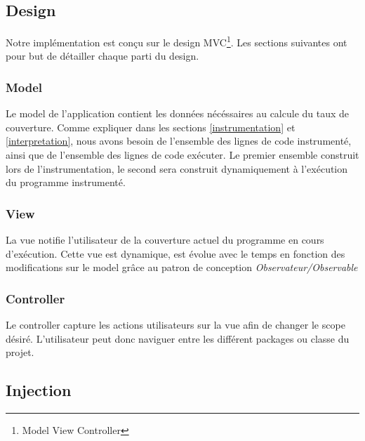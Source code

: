 \subsection{Design}

Notre implémentation est conçu sur le design MVC\footnote{Model View Controller}. Les sections suivantes ont pour but de détailler chaque parti du design.

\subsubsection{Model}

Le model de l'application contient les données nécéssaires au calcule du taux de couverture. Comme expliquer dans les sections \ref{instrumentation} et \ref{interpretation}, nous avons besoin de l'ensemble des lignes de code instrumenté, ainsi que de l'ensemble des lignes de code exécuter. Le premier ensemble construit lors de l'instrumentation, le second sera construit dynamiquement à l'exécution du programme instrumenté.

\subsubsection{View}

La vue notifie l'utilisateur de la couverture actuel du programme en cours d'exécution. Cette vue est dynamique, est évolue avec le temps en fonction des modifications sur le model grâce au patron de conception \textit{Observateur/Observable}

\subsubsection{Controller}

Le controller capture les actions utilisateurs sur la vue afin de changer le scope désiré. L'utilisateur peut donc naviguer entre les différent packages ou classe du projet.

\subsection{Injection}




